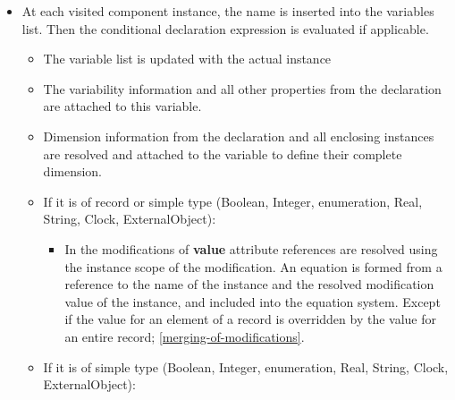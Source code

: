 \begin{itemize}
\item
  At each visited component instance, the name is inserted into the
  variables list. Then the conditional declaration expression is
  evaluated if applicable.

  \begin{itemize}
  \item
    The variable list is updated with the actual instance
  \item
    The variability information and all other properties from the
    declaration are attached to this variable.
  \item
    Dimension information from the declaration and all enclosing
    instances are resolved and attached to the variable to define their
    complete dimension.
  \item
    If it is of record or simple type (Boolean, Integer, enumeration,
    Real, String, Clock, ExternalObject):

    \begin{itemize}
    \item
      In the modifications of \textbf{value} attribute references are
      resolved using the instance scope of the modification. An equation
      is formed from a reference to the name of the instance and the
      resolved modification value of the instance, and included into the
      equation system. Except if the value for an element of a record is
      overridden by the value for an entire record; \ref{merging-of-modifications}.
    \end{itemize}
  \item
    If it is of simple type (Boolean, Integer, enumeration, Real,
    String, Clock, ExternalObject):


\end{itemize}
\end{itemize}
